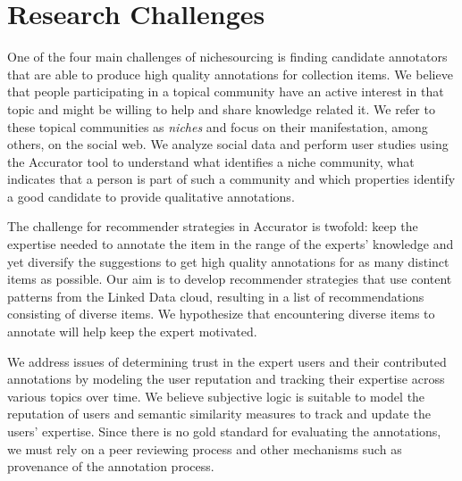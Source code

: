 \section{Research Challenges}
\label{use_case}

One of the four main challenges of nichesourcing is finding candidate annotators that are able to produce high quality annotations for collection items. 
We believe that people participating in a topical community have an active interest in that topic and might be willing to help and share knowledge related it. We refer to these topical communities as \textit{niches} and focus on their manifestation, among others, on the social web. We analyze social data and perform user studies using the Accurator tool to understand what identifies a niche community, what indicates that a person is part of such a community and which properties identify a good candidate to provide qualitative annotations. 

The challenge for recommender strategies in Accurator is twofold: keep the expertise needed to annotate the item in the range of the experts' knowledge and yet diversify the suggestions to get high quality annotations for as many distinct items as possible. 
Our aim is to develop recommender strategies that use content patterns from the Linked Data cloud, resulting in a list of recommendations consisting of diverse items. 
We hypothesize that encountering diverse items to annotate will help keep the expert motivated.

We address issues of determining trust in the expert users and their contributed annotations by modeling the user reputation and tracking their expertise across various topics over time. We believe subjective logic is suitable to model the reputation of users and semantic similarity measures to track and update the users' expertise. Since there is no gold standard for evaluating the annotations, we must rely on a peer reviewing process and other mechanisms such as provenance of the annotation process.

